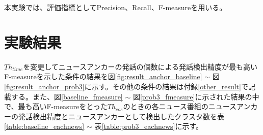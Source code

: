 本実験では、評価指標としてPrecision、Recall、F-measureを用いる。

\section{実験結果}
\par
$Th_{time}$を変更してニュースアンカーの発話の個数による発話検出精度が最も高いF-measureを示した条件の結果を図\ref{fig:result_anchor_baseline} $\sim$ 図\ref{fig:result_anchor_prob3}に示す。その他の条件の結果は付録\ref{other_result}で記載する。また、図\ref{baseline_fmeasure} $\sim$ 図\ref{prob3_fmeasure}に示された結果の中で、最も高いF-measureをとった$Th_{cos}$のときの各ニュース番組のニュースアンカーの発話検出精度とニュースアンカーとして検出したクラスタ数を表\ref{table:baseline_eachnews} $\sim$ 表\ref{table:prob3_eachnews}に示す。

